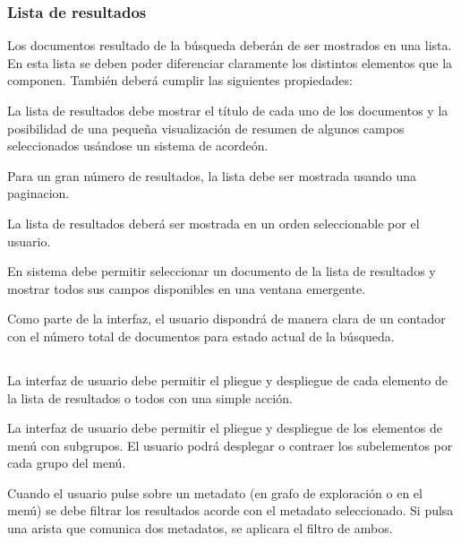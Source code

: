 \subsubsection{Lista de resultados}
Los documentos resultado de la búsqueda deberán de ser mostrados en una lista. En esta lista se deben poder diferenciar claramente los distintos elementos que la componen. También deberá cumplir las siguientes propiedades: 

\begin{itemize}
La lista de resultados debe mostrar el título de cada uno de los documentos y la posibilidad de una pequeña visualización de resumen de algunos campos seleccionados usándose un sistema de acordeón.

Para un gran número de resultados, la lista debe ser mostrada usando una \gls{paginacion}.

La lista de resultados deberá ser mostrada en un orden seleccionable por el usuario.

En sistema debe permitir seleccionar un documento de la lista de resultados y mostrar todos sus campos disponibles en una ventana emergente.

Como parte de la interfaz, el usuario dispondrá de manera clara de un contador con el número total de documentos para estado actual de la búsqueda. 
\end{itemize}


\subsection{}
\label{subsection:funcionales}

La interfaz de usuario debe permitir el pliegue y despliegue de cada elemento de la lista de resultados o todos con una simple acción.

La interfaz de usuario debe permitir el pliegue y despliegue de los elementos de menú con subgrupos. El usuario podrá desplegar o contraer los subelementos por cada grupo del menú.

Cuando el usuario pulse sobre un \gls{metadato} (en grafo de exploración o en el menú) se debe filtrar los resultados acorde con el \gls{metadato} seleccionado. Si pulsa una arista que comunica dos \glspl{metadato}, se aplicara el filtro de ambos.

